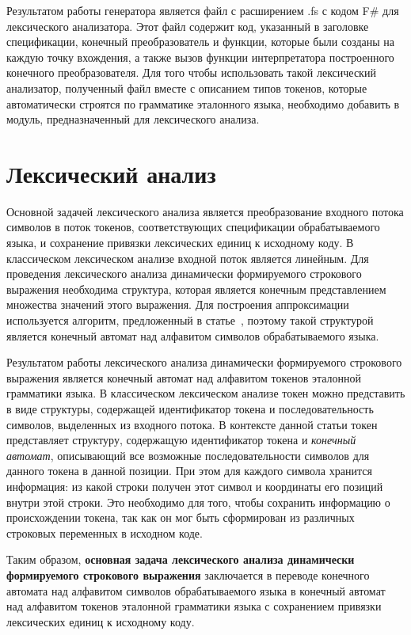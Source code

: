 \documentclass[10pt, conference, compsocconf]{IEEEtran}
\begin{document}
Результатом работы генератора является файл с расширением .fs с кодом F\# для лексического анализатора. Этот файл содержит код, указанный в заголовке спецификации, конечный преобразователь и функции, которые были созданы на каждую точку вхождения, а также вызов функции интерпретатора построенного конечного преобразователя. Для того чтобы использовать такой лексический анализатор, полученный файл вместе с описанием типов токенов, которые автоматически строятся по грамматике эталонного языка, необходимо добавить в модуль, предназначенный для лексического анализа. 


\section{Лексический анализ}
Основной задачей лексического анализа является преобразование входного потока символов в поток токенов, соответствующих спецификации обрабатываемого языка, и сохранение привязки лексических единиц к исходному коду. В классическом лексическом анализе входной поток является линейным. Для проведения лексического анализа динамически формируемого строкового выражения необходима структура, которая является  конечным представлением множества значений этого выражения. Для построения аппроксимации используется алгоритм, предложенный в статье~\cite{AlgoFangYu}, поэтому такой структурой является конечный автомат над алфавитом символов обрабатываемого языка. 

Результатом работы лексического анализа динамически формируемого строкового выражения является конечный автомат над алфавитом токенов эталонной грамматики языка. В классическом лексическом анализе токен можно представить в виде структуры, содержащей идентификатор токена и последовательность символов, выделенных из входного потока. В контексте данной статьи токен представляет структуру, содержащую идентификатор токена и \textit{конечный автомат}, описывающий все возможные последовательности символов для данного токена в данной позиции. При этом для каждого символа хранится информация: из какой строки получен этот символ и координаты его позиций внутри этой строки. Это необходимо для того, чтобы сохранить информацию о происхождении токена, так как он мог быть сформирован из различных строковых переменных в исходном коде.

Таким образом, \textbf{основная задача лексического анализа динамически формируемого строкового выражения} заключается в переводе конечного автомата над алфавитом символов обрабатываемого языка в конечный автомат над алфавитом токенов эталонной грамматики языка с сохранением привязки лексических единиц к исходному коду.
\end{document}
